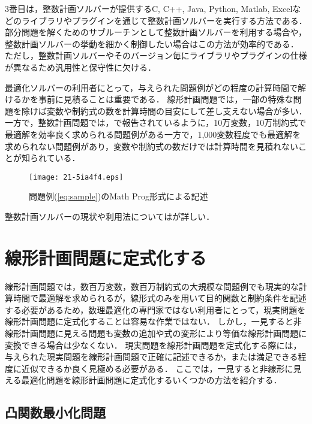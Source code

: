 \documentclass[japanese]{jnlp_1.4}
\begin{document}
3番目は，整数計画ソルバーが提供するC, C++, Java, Python, Matlab, Excelなどのライブラリやプラグインを通じて整数計画ソルバーを実行する方法である．
部分問題を解くためのサブルーチンとして整数計画ソルバーを利用する場合や，整数計画ソルバーの挙動を細かく制御したい場合はこの方法が効率的である．
ただし，整数計画ソルバーやそのバージョン毎にライブラリやプラグインの仕様が異なるため汎用性と保守性に欠ける．

最適化ソルバーの利用者にとって，与えられた問題例がどの程度の計算時間で解けるかを事前に見積ることは重要である．
線形計画問題では，一部の特殊な問題を除けば変数や制約式の数を計算時間の目安にして差し支えない場合が多い．
一方で，整数計画問題では，\cite{KochT2011}で報告されているように，10万変数，10万制約式で最適解を効率良く求められる問題例がある一方で，1,000変数程度でも最適解を求められない問題例があり，変数や制約式の数だけでは計算時間を見積れないことが知られている．

\begin{figure}[t]
\begin{center}
\texttt{[image: 21-5ia4f4.eps]}
\end{center}
\caption{問題例(\ref{eq:sample})のMath Prog形式による記述}
\label{fig:mod-sample}
\end{figure}

整数計画ソルバーの現状や利用法については\cite{BertholdT2012,FujieT2011,MiyashiroR-Web,MiyashiroR2012,MiyashiroR2006}が詳しい．


\section{線形計画問題に定式化する}
\label{sec:lp-model}

線形計画問題では，数百万変数，数百万制約式の大規模な問題例でも現実的な計算時間で最適解を求められるが，線形式のみを用いて目的関数と制約条件を記述する必要があるため，数理最適化の専門家ではない利用者にとって，現実問題を線形計画問題に定式化することは容易な作業ではない．
しかし，一見すると非線形計画問題に見える問題も変数の追加や式の変形により等価な線形計画問題に変換できる場合は少なくない．
現実問題を線形計画問題を定式化する際には，与えられた現実問題を線形計画問題で正確に記述できるか，または満足できる程度に近似できるか良く見極める必要がある．
ここでは，一見すると非線形に見える最適化問題を線形計画問題に定式化するいくつかの方法を紹介する．


\subsection{凸関数最小化問題}
\label{sec:convex-piecewise-liear}
\end{document}
